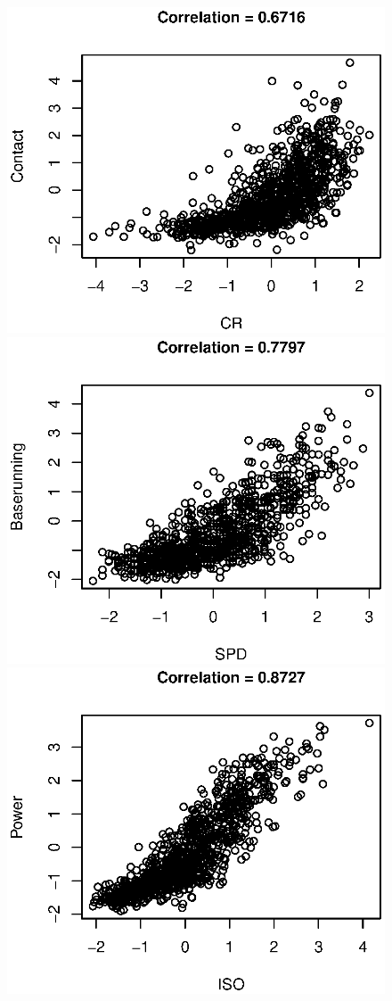 \begin{figure}[h!]
\centering
{}
    \includegraphics[width=.85\textwidth]{img/fsdm_results/contact_corr.eps}
\endminipage\hfill
{}
    \includegraphics[width=.85\textwidth]{img/fsdm_results/baserun_corr.eps}
\endminipage
\hfill
{}
    \includegraphics[width=.85\textwidth]{img/fsdm_results/power_corr.eps}

\end{figure}
